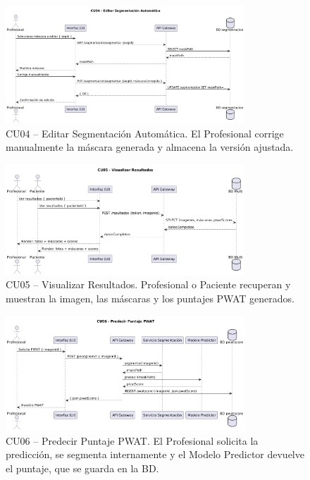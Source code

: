 \begin{figure}[H]
  \centering
  \includegraphics[width=0.8\textwidth]{imagenes/cu04_seq.png}
  \caption{CU04 – Editar Segmentación Automática. El Profesional corrige manualmente la máscara generada y almacena la versión ajustada.}
  \label{fig:cu04_seq}
\end{figure}

\begin{figure}[H]
  \centering
  \includegraphics[width=0.8\textwidth]{imagenes/cu05_seq.png}
  \caption{CU05 – Visualizar Resultados. Profesional o Paciente recuperan y muestran la imagen, las máscaras y los puntajes PWAT generados.}
  \label{fig:cu05_seq}
\end{figure}

\begin{figure}[H]
  \centering
  \includegraphics[width=0.8\textwidth]{imagenes/cu06_seq.png}
  \caption{CU06 – Predecir Puntaje PWAT. El Profesional solicita la predicción, se segmenta internamente y el Modelo Predictor devuelve el puntaje, que se guarda en la BD.}
  \label{fig:cu06_seq}
\end{figure}

